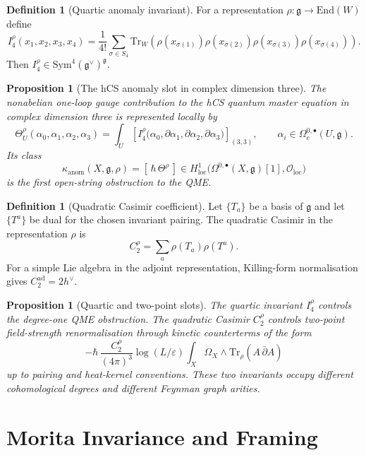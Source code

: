 \documentclass[11pt]{amsart}
\newtheorem{proposition}[theorem]{Proposition}
\theoremstyle{definition}
\newtheorem{definition}[theorem]{Definition}
\theoremstyle{remark}
\providecommand{\cO}{\mathcal{O}}
\providecommand{\End}{\mathrm{End}}
\providecommand{\Sym}{\mathrm{Sym}}
\providecommand{\Tr}{\mathrm{Tr}}
\providecommand{\dbar}{\bar\partial}
\providecommand{\fg}{\mathfrak{g}}
\providecommand{\kanom}{\kappa_{\mathrm{anom}}}
\begin{document}
\begin{definition}[Quartic anomaly invariant]
\label{def:quartic-invariant}
For a representation $\rho\colon\fg\to\End(W)$ define
\[
  I_4^\rho(x_1,x_2,x_3,x_4)
  =
  \frac1{4!}\sum_{\sigma\in S_4}
  \Tr_W\!\left(
    \rho(x_{\sigma(1)})\rho(x_{\sigma(2)})
    \rho(x_{\sigma(3)})\rho(x_{\sigma(4)})
  \right).
\]
Then $I_4^\rho\in\Sym^4(\fg^\vee)^\fg$.
\end{definition}

\begin{proposition}[The hCS anomaly slot in complex dimension three]
\label{prop:quartic-anomaly}
The nonabelian one-loop gauge contribution to the hCS quantum master
equation in complex dimension three is represented locally by
\[
  \Theta^\rho_U(\alpha_0,\alpha_1,\alpha_2,\alpha_3)
  =
  \int_U
  \left[
  I_4^\rho
    \bigl(\alpha_0,\partial\alpha_1,\partial\alpha_2,\partial\alpha_3\bigr)
  \right]_{(3,3)},
  \qquad
  \alpha_i\in\Omega_c^{0,\bullet}(U,\fg).
\]
Its class
\[
  \kanom(X,\fg,\rho)
  =
  [\,\hbar\,\Theta^\rho\,]
  \in
  H^1_{\mathrm{loc}}
    \bigl(\Omega^{0,\bullet}(X,\fg)[1],\cO_{\mathrm{loc}}\bigr)
\]
is the first open-string obstruction to the QME.
\end{proposition}

\begin{definition}[Quadratic Casimir coefficient]
\label{def:quadratic-casimir}
Let $\{T_a\}$ be a basis of $\fg$ and let $\{T^a\}$ be dual for the chosen
invariant pairing.  The quadratic Casimir in the representation $\rho$ is
\[
  C_2^\rho=\sum_a \rho(T_a)\rho(T^a).
\]
For a simple Lie algebra in the adjoint representation, Killing-form
normalisation gives $C_2^{\mathrm{ad}}=2h^\vee$.
\end{definition}

\begin{proposition}[Quartic and two-point slots]
\label{prop:anomaly-casimir-slots}
The quartic invariant $I_4^\rho$ controls the degree-one QME obstruction.
The quadratic Casimir $C_2^\rho$ controls two-point field-strength
renormalisation through kinetic counterterms of the form
\[
  -\hbar\,\frac{C_2^\rho}{(4\pi)^3}\log(L/\varepsilon)
  \int_X \Omega_X\wedge\Tr_\rho(A\,\dbar A)
\]
up to pairing and heat-kernel conventions.  These two invariants occupy
different cohomological degrees and different Feynman graph arities.
\end{proposition}

\section{Morita Invariance and Framing}
\end{document}
